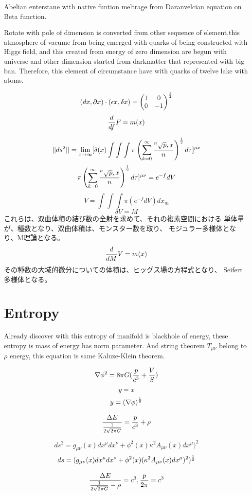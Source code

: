 \documentclass{jsarticle}
\begin{document}
      Abelian enterstane with native funtion meltrage from Daranvelcian
      equation on Beta function.
 
       Rotate with pole of dimension is converted from 
       other sequence of element,this atmosphere of vacume 
       from being emerged with quarks of being constructed
with Higgs field, and this created from energy of zero dimension are begun with
universe and other dimension started from darkmatter that represented with 
big-ban.
Therefore, this element of circumstance have with quarks of twelve lake with
atoms.

  $$ (dx, \partial x)\cdot (\epsilon x, \delta x) = \begin{pmatrix}
	  1 & 0 \\
  0 & - 1 \end{pmatrix}^{1 \over 2}  $$
  $$ {d \over df} F = m(x) $$

$$ ||ds^2|| = \lim_{x \to \infty} [\delta(x) \int \int \int \pi \left( \sum_{k=0}^{\infty}
		{{}^n\sqrt{p},x \over n} \right)
^{1 \over 2}d \tau]^{\mu\nu} $$
$$ \pi \left( \sum_{k=0}^{\infty}
		{{}^n\sqrt{p},x \over n} \right)
^{1 \over 2}d \tau]^{\mu\nu} = e^{-f}dV $$
$$ V = \int \int \int \pi(e^{-f}dV)dx_m $$
$$ \delta V = M $$
これらは、双曲体積の結び数の全射を求めて、それの複素空間における
単体量が、種数となり、双曲体積は、モンスター数を取り、
モジュラー多様体となり、M理論となる。
$$ {d \over d M}V = m(x) $$
その種数の大域的微分についての体積は、ヒッグス場の方程式となり、
Seifert多様体となる。
\section{Entropy}
   Already discover with this entropy of manifold is blackhole of energy, these entropy is mass of energy has
norm parameter. And string theorem $ T_{\mu\nu}$  belong to $ \rho $ energy, this equation is same Kaluze-Klein theorem.


 $$ \nabla \phi^2 = 8 \pi G({p \over c^3} + {V \over S})$$

 $$  y = x $$
 $$  y = (\nabla \phi)^{1 \over 2} $$

  $$ {\Delta E \over {1 \over 2\sqrt{2 \pi G}}} = {p \over c^3} + \rho $$

  $$ ds^2 = g_{\mu\nu}(x)dx^{\mu}dx^{\nu} + \phi^2(x)\kappa^2 A_{\mu\nu}(x)dx^{\mu})^2 $$
  $$ ds = (g_{\mu\nu}(x)dx^{\mu}dx^{\nu} + \phi^2(x)(\kappa^2 A_{\mu\nu}(x)dx^{\mu})^2)^{1 \over 2} $$

  $$ {\Delta E \over {1 \over 2\sqrt{2 \pi G}} - \rho} = c^3, {p \over 2 \pi} = c^3 $$
    
\end{document}
